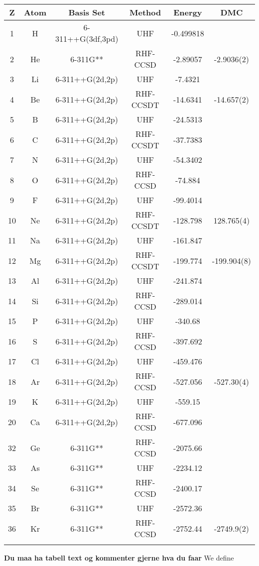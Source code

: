 \begin{center}
\begin{tabular}{ c c c c c c }
	\hline
  	Z & Atom & Basis Set & Method & Energy & DMC \\ \hline
  	1 & H & 6-311++G(3df,3pd) & UHF & -0.499818
  	&  \\
  	2 & He & 6-311G** & RHF-CCSD & -2.89057 
  	& -2.9036(2) \\ \hline
  	3 & Li & 6-311++G(2d,2p) & UHF & -7.4321 
  	& \\
  	4 & Be & 6-311++G(2d,2p) & RHF-CCSDT & -14.6341 & -14.657(2) \\
  	5 & B & 6-311++G(2d,2p) & UHF & -24.5313& \\
  	6 & C & 6-311++G(2d,2p) & RHF-CCSDT & -37.7383 &\\
  	7 & N & 6-311++G(2d,2p) & UHF & -54.3402 &\\
  	8 & O & 6-311++G(2d,2p) & RHF-CCSD & -74.884& \\
  	9 & F & 6-311++G(2d,2p) & UHF & -99.4014& \\
  	10 & Ne & 6-311++G(2d,2p) & RHF-CCSDT & -128.798 & 128.765(4) \\  \hline
  	11 & Na & 6-311++G(2d,2p) & UHF & -161.847& \\
  	12 & Mg & 6-311++G(2d,2p) & RHF-CCSDT & -199.774 & -199.904(8)\\
  	13 & Al & 6-311++G(2d,2p) & UHF & -241.874& \\
  	14 & Si & 6-311++G(2d,2p) & RHF-CCSD & -289.014 &\\
  	15 & P & 6-311++G(2d,2p) & UHF & -340.68& \\ 
  	16 & S & 6-311++G(2d,2p) & RHF-CCSD & -397.692 &\\
  	17 & Cl & 6-311++G(2d,2p) & UHF & -459.476& \\
  	18 & Ar & 6-311++G(2d,2p) & RHF-CCSD & -527.056& -527.30(4) \\
  	\hline
  	19 & K & 6-311++G(2d,2p) & UHF & -559.15& \\
  	20 & Ca & 6-311++G(2d,2p) & RHF-CCSD & -677.096& \\ \hline
  	32 & Ge & 6-311G** & RHF-CCSD & -2075.66& \\
  	33 & As & 6-311G** & UHF & -2234.12& \\
  	34 & Se & 6-311G** & RHF-CCSD & -2400.17& \\
  	35 & Br & 6-311G** & UHF & -2572.36 &\\
  	36 & Kr & 6-311G** & RHF-CCSD & -2752.44& -2749.9(2) \\
  	\hline
  	\\
	\end{tabular}
\end{center}
{\bf Du maa ha tabell text og kommenter gjerne hva du faar} We define

